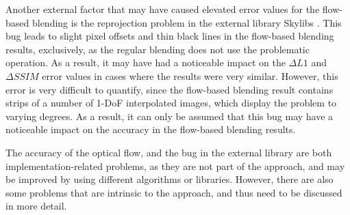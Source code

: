 
Another external factor that may have caused elevated error values for the flow-based blending is the reprojection problem in the external library Skylibs \cite{skylibs}. This bug leads to slight pixel offsets and thin black lines in the flow-based blending results, exclusively, as the regular blending does not use the problematic operation. As a result, it may have had a noticeable impact on the $\Delta L1$ and $\Delta SSIM$ error values in cases where the results were very similar. However, this error is very difficult to quantify, since the flow-based blending result contains strips of a number of 1-DoF interpolated images, which display the problem to varying degrees. As a result, it can only be assumed that this bug may have a noticeable impact on the accuracy in the flow-based blending results.

The accuracy of the optical flow, and the bug in the external library are both implementation-related problems, as they are not part of the approach, and may be improved by using different algorithms or libraries. However, there are also some problems that are intrinsic to the approach, and thus need to be discussed in more detail.

